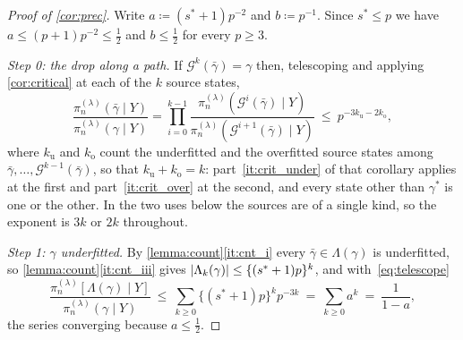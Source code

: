 \begin{proof}[Proof of \cref{cor:prec}]
    Write $a\coloneq(s^{\ast}+1)p^{-2}$ and $b\coloneq p^{-1}$. Since
    $s^{\ast}\leq p$ we have $a\leq(p+1)p^{-2}\leq\tfrac12$ and
    $b\leq\tfrac12$ for every $p\geq3$.

    \emph{Step 0: the drop along a path.} If
    $\mathcal{G}^{k}(\bar\gamma)=\gamma$ then, telescoping and applying
    \cref{cor:critical} at each of the $k$ source states,
    \begin{equation}
        \label{eq:telescope}
        \frac{\pi_n^{(\lambda)}(\bar\gamma\mid Y)}
        {\pi_n^{(\lambda)}(\gamma\mid Y)}
        =\prod_{i=0}^{k-1}
        \frac{\pi_n^{(\lambda)}(\mathcal{G}^{i}(\bar\gamma)\mid Y)}
        {\pi_n^{(\lambda)}(\mathcal{G}^{i+1}(\bar\gamma)\mid Y)}
        \ \leq\ p^{-3k_{\mathrm{u}}-2k_{\mathrm{o}}} ,
    \end{equation}
    where $k_{\mathrm{u}}$ and $k_{\mathrm{o}}$ count the underfitted and
    the overfitted source states among
    $\bar\gamma,\dots,\mathcal{G}^{k-1}(\bar\gamma)$, so that
    $k_{\mathrm{u}}+k_{\mathrm{o}}=k$: part~\ref{it:crit_under} of that
    corollary applies at the first and part~\ref{it:crit_over} at the
    second, and every state other than $\gamma^{\ast}$ is one or the other.
    In the two uses below the sources are of a single kind, so the exponent
    is $3k$ or $2k$ throughout.

    \emph{Step 1: $\gamma$ underfitted.} By
    \cref{lemma:count}\ref{it:cnt_i} every $\bar\gamma\in\Lambda(\gamma)$
    is underfitted, so \cref{lemma:count}\ref{it:cnt_iii} gives
    $\lvert\Lambda_k(\gamma)\rvert\leq\{(s^{\ast}+1)p\}^{k}$, and
    with~\eqref{eq:telescope}
    \begin{equation}
        \label{eq:precunder}
        \frac{\pi_n^{(\lambda)}[\Lambda(\gamma)\mid Y]}
        {\pi_n^{(\lambda)}(\gamma\mid Y)}
        \ \leq\ \sum_{k\geq0}\{(s^{\ast}+1)p\}^{k}p^{-3k}
        \ =\ \sum_{k\geq0}a^{k}\ =\ \frac{1}{1-a} ,
    \end{equation}
    the series converging because $a\leq\tfrac12$.


\end{proof}
